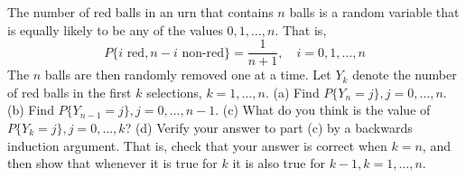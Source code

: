 
\begin{exercise}
\label{ex:conditioning-expectation-65}
    The number of red balls in an urn that contains $n$ balls is a random variable that is equally likely to be any of the values $0, 1, \dots, n$. That is,
    \[
    P\{i \text{ red}, n - i \text{ non-red}\} = \frac{1}{n+1}, \quad i = 0, 1, \dots, n
    \]
    The $n$ balls are then randomly removed one at a time. Let $Y_k$ denote the number of red balls in the first $k$ selections, $k = 1, \dots, n$.
    (a) Find $P\{Y_n = j\}, j = 0, \dots, n$.
    (b) Find $P\{Y_{n-1} = j\}, j = 0, \dots, n-1$.
    (c) What do you think is the value of $P\{Y_k = j\}, j = 0, \dots, k$?
    (d) Verify your answer to part (c) by a backwards induction argument. That is, check that your answer is correct when $k = n$, and then show that whenever it is true for $k$ it is also true for $k - 1, k = 1, \dots, n$.
\end{exercise}

